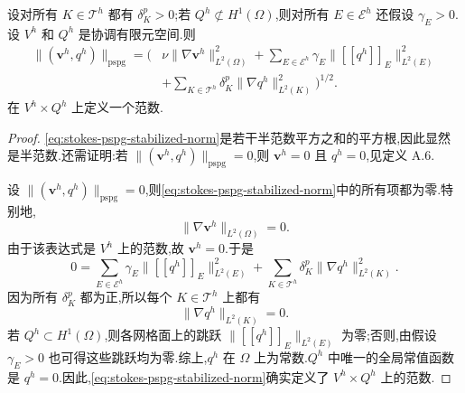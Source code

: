 \begin{lemma}\label{lem:stokes-pspg-stabilized-norm}
设对所有 $K\in\mathcal{T}^h$ 都有 $\delta_K^p>0$;若 $Q^h\not\subset H^1(\Omega)$,则对所有 $E\in\mathcal{E}^h$ 还假设 $\gamma_E>0$.设 $V^h$ 和 $Q^h$ 是协调有限元空间.则
\begin{equation}\label{eq:stokes-pspg-stabilized-norm}
\begin{aligned}
 \|(\bm{v}^h,q^h)\|_{\mathrm{pspg}}
 =\Biggl(&\nu\|\nabla\bm{v}^h\|_{L^2(\Omega)}^2
   +\sum_{E\in\mathcal{E}^h}
       \gamma_E\|\left[\!\left[q^h\right]\!\right]_E\|_{L^2(E)}^2\\
   &+\sum_{K\in\mathcal{T}^h}
       \delta_K^p\|\nabla q^h\|_{L^2(K)}^2
       \Biggr)^{1/2}.
\end{aligned}
\end{equation}
在 $V^h\times Q^h$ 上定义一个范数.
\end{lemma}
\begin{proof}
\cref{eq:stokes-pspg-stabilized-norm}是若干半范数平方之和的平方根,因此显然是半范数.还需证明:若 $\|(\bm{v}^h,q^h)\|_{\mathrm{pspg}}=0$,则 $\bm{v}^h=0$ 且 $q^h=0$,见定义 A.6.

设 $\|(\bm{v}^h,q^h)\|_{\mathrm{pspg}}=0$,则\cref{eq:stokes-pspg-stabilized-norm}中的所有项都为零.特别地,
\[
 \|\nabla\bm{v}^h\|_{L^2(\Omega)}=0.
\]
由于该表达式是 $V^h$ 上的范数,故 $\bm{v}^h=0$.于是
\[
 0=\sum_{E\in\mathcal{E}^h}
      \gamma_E\|\left[\!\left[q^h\right]\!\right]_E\|_{L^2(E)}^2
    +\sum_{K\in\mathcal{T}^h}
      \delta_K^p\|\nabla q^h\|_{L^2(K)}^2.
\]
因为所有 $\delta_K^p$ 都为正,所以每个 $K\in\mathcal{T}^h$ 上都有
\[
 \|\nabla q^h\|_{L^2(K)}=0.
\]
若 $Q^h\subset H^1(\Omega)$,则各网格面上的跳跃 $\|\left[\!\left[q^h\right]\!\right]_E\|_{L^2(E)}$ 为零;否则,由假设 $\gamma_E>0$ 也可得这些跳跃均为零.综上,$q^h$ 在 $\Omega$ 上为常数.$Q^h$ 中唯一的全局常值函数是 $q^h=0$.因此,\cref{eq:stokes-pspg-stabilized-norm}确实定义了 $V^h\times Q^h$ 上的范数.
\end{proof}


